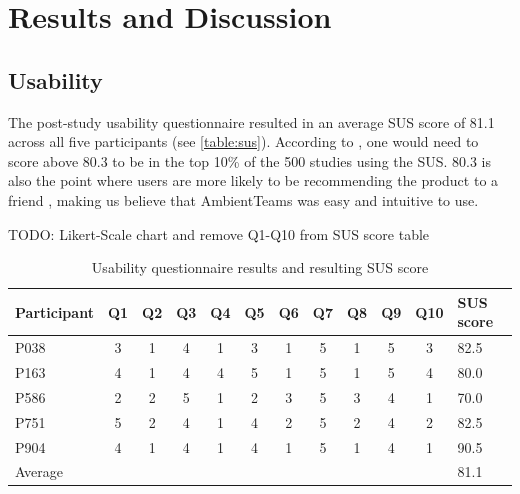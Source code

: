 \chapter{Results and Discussion}
\label{chapter:results_and_discussion}

\section{Usability}
\label{section:usability}

The post-study usability questionnaire resulted in an average SUS score of 81.1 across all five participants (see \autoref{table:sus}). According to \textcite{sauroSUS}, one would need to score above 80.3 to be in the top 10\% of the 500 studies using the SUS. 80.3 is also the point where users are more likely to be recommending the product to a friend \autocite{sauroSUS}, making us believe that AmbientTeams was easy and intuitive to use.

TODO: Likert-Scale chart and remove Q1-Q10 from SUS score table

\begin{table}[h]
    \centering
    \begin{tabular}{|l c c c c c c c c c c l|}
        \hline
        Participant & Q1 & Q2 & Q3 & Q4 & Q5 & Q6 & Q7 & Q8 & Q9 & Q10 & SUS score \\
        \hline
        P038        & 3  & 1  & 4  & 1  & 3  & 1  & 5  & 1  & 5  & 3   & 82.5      \\
        P163        & 4  & 1  & 4  & 4  & 5  & 1  & 5  & 1  & 5  & 4   & 80.0      \\
        P586        & 2  & 2  & 5  & 1  & 2  & 3  & 5  & 3  & 4  & 1   & 70.0      \\
        P751        & 5  & 2  & 4  & 1  & 4  & 2  & 5  & 2  & 4  & 2   & 82.5      \\
        P904        & 4  & 1  & 4  & 1  & 4  & 1  & 5  & 1  & 4  & 1   & 90.5      \\
        Average     &    &    &    &    &    &    &    &    &    &     & 81.1      \\
        \hline
    \end{tabular}
    \caption{Usability questionnaire results and resulting SUS score}
    \label{table:sus}
\end{table}

